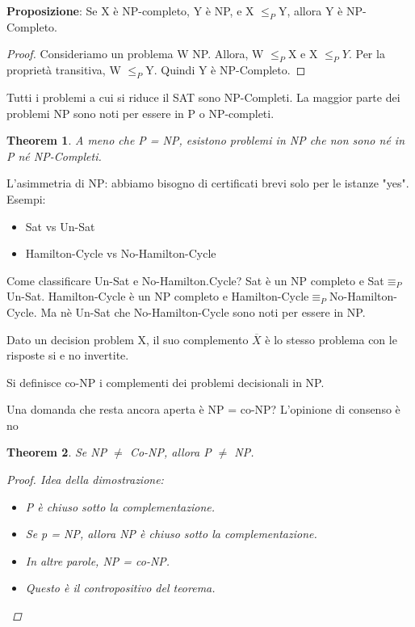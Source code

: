 \documentclass{article}
\newtheorem{theorem}{Theorem}[subsection]
\begin{document}
\noindent \textbf{Proposizione}: Se X è NP-completo, Y è NP, e X $\leq_P$Y, allora Y è NP-Completo.
\begin{proof}
    Consideriamo un problema W NP. Allora, W $\leq_P$X e X $\leq_P Y$. Per la proprietà transitiva, W $\leq_P$Y. Quindi Y è NP-Completo.
\end{proof}
\noindent Tutti i problemi a cui si riduce il SAT sono NP-Completi.
\noindent La maggior parte dei problemi NP sono noti per essere in P o NP-completi.
\begin{theorem}
    A meno che P = NP, esistono problemi in NP che non sono né in P né NP-Completi.
\end{theorem}
\noindent L'asimmetria di NP: abbiamo bisogno di certificati brevi solo per le istanze "yes".
Esempi:
\begin{itemize}
    \item Sat vs Un-Sat
    \item Hamilton-Cycle vs No-Hamilton-Cycle
\end{itemize}

\noindent Come classificare Un-Sat e No-Hamilton.Cycle? Sat è un NP completo e Sat$\equiv_P$Un-Sat. Hamilton-Cycle è un NP completo e Hamilton-Cycle$\equiv_P$No-Hamilton-Cycle. Ma nè Un-Sat che No-Hamilton-Cycle sono noti per essere in NP.

\noindent Dato un decision problem X, il suo complemento $\overline{X}$ è lo stesso problema con le risposte si e no invertite.

\noindent Si definisce co-NP i complementi dei problemi decisionali in NP.

\noindent Una domanda che resta ancora aperta è NP = co-NP? L'opinione di consenso è no 

\begin{theorem}
    Se NP $\neq$ Co-NP, allora P $\neq$ NP.
    \begin{proof}
        Idea della dimostrazione:
        \begin{itemize}
            \item P è chiuso sotto la complementazione.
            \item Se p = NP, allora NP è chiuso sotto la complementazione.
            \item In altre parole, NP = co-NP.
            \item Questo è il contropositivo del teorema.
        \end{itemize}
    \end{proof}
\end{theorem}
\newpage
\end{document}
